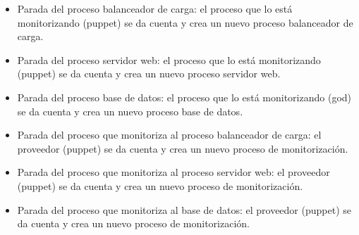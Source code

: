 \begin{itemize}
\item Parada del proceso balanceador de carga: el proceso que lo está monitorizando (puppet) se da cuenta y crea un nuevo proceso balanceador de carga.
\item Parada del proceso servidor web: el proceso que lo está monitorizando (puppet) se da cuenta y crea un nuevo proceso servidor web.
\item Parada del proceso base de datos: el proceso que lo está monitorizando (god) se da cuenta y crea un nuevo proceso base de datos.
\item Parada del proceso que monitoriza al proceso balanceador de carga: el proveedor (puppet) se da cuenta y crea un nuevo proceso de monitorización.
\item Parada del proceso que monitoriza al proceso servidor web: el proveedor (puppet) se da cuenta y crea un nuevo proceso de monitorización.
\item Parada del proceso que monitoriza al base de datos: el proveedor (puppet) se da cuenta y crea un nuevo proceso de monitorización.
\end{itemize}
